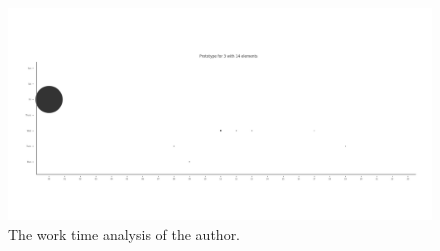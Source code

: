 \begin{figure}[H]
    \includegraphics[scale=0.20]{./graphs/analysis-affinity/3}
    \centering
    \caption{The work time analysis of the author.}\label{fig:missing-time}
\end{figure}
